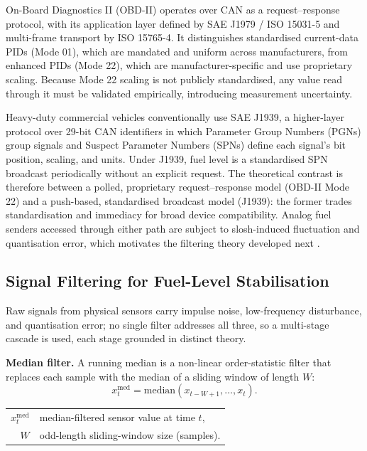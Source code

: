 On-Board Diagnostics II (OBD-II) operates over CAN as a request--response protocol, with its application layer defined by SAE J1979 / ISO 15031-5 and multi-frame transport by ISO 15765-4. It distinguishes standardised current-data PIDs (Mode 01), which are mandated and uniform across manufacturers, from enhanced PIDs (Mode 22), which are manufacturer-specific and use proprietary scaling. Because Mode 22 scaling is not publicly standardised, any value read through it must be validated empirically, introducing measurement uncertainty.

Heavy-duty commercial vehicles conventionally use SAE J1939, a higher-layer protocol over 29-bit CAN identifiers in which Parameter Group Numbers (PGNs) group signals and Suspect Parameter Numbers (SPNs) define each signal's bit position, scaling, and units. Under J1939, fuel level is a standardised SPN broadcast periodically without an explicit request. The theoretical contrast is therefore between a polled, proprietary request--response model (OBD-II Mode 22) and a push-based, standardised broadcast model (J1939): the former trades standardisation and immediacy for broad device compatibility. Analog fuel senders accessed through either path are subject to slosh-induced fluctuation and quantisation error, which motivates the filtering theory developed next \cite{iso15031_5,sae_j1939,iso15765_4,sae_j1962,sae_j1979,iso11898_1,bosch1991can}.

\subsection{Signal Filtering for Fuel-Level Stabilisation}

Raw signals from physical sensors carry impulse noise, low-frequency disturbance, and quantisation error; no single filter addresses all three, so a multi-stage cascade is used, each stage grounded in distinct theory.

\textbf{Median filter.} A running median is a non-linear order-statistic filter that replaces each sample with the median of a sliding window of length $W$:
%
\begin{equation}
x_t^{\mathrm{med}} = \mathrm{median}(x_{t-W+1}, \ldots, x_t).
\label{eq:median-filter-ch3}
\end{equation}
\begin{tabular}{@{}r@{~=~}l@{}}
$x_t^{\mathrm{med}}$ & median-filtered sensor value at time $t$, \\
$W$ & odd-length sliding-window size (samples).
\end{tabular}

